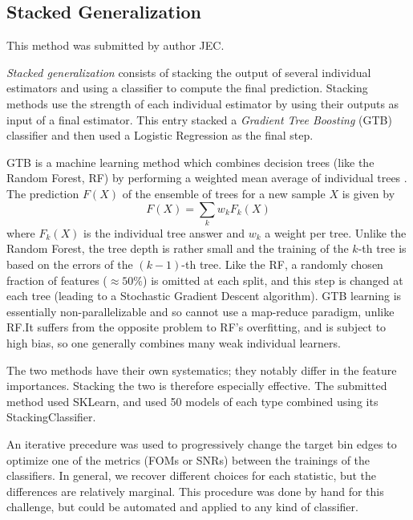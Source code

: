 \documentclass[twocolumn,twocolappendix]{aastex63}
\begin{document}
\subsection{ {\sc Stacked Generalization} }
This method was submitted by author JEC.

\emph{Stacked generalization} consists of stacking the output of several individual estimators and 
using a classifier to compute the final prediction. Stacking methods use the strength of each 
individual estimator by using their outputs as input of a final estimator.  This entry stacked
a \emph{Gradient Tree Boosting} (GTB) classifier and then used a Logistic Regression as the final step.

GTB is a machine learning method which combines decision trees (like the Random Forest, RF)
by performing a weighted mean average of individual trees \citep{Friedman:2002we,RefWorks:1634}. 
The prediction $F(X)$ of the ensemble of trees for a new sample $X$ is given by
\begin{equation}
F(X) = \sum_k w_k F_k(X)
\end{equation}
where $F_k(X)$ is the individual tree answer and $w_k$ a weight per tree. Unlike the Random Forest, the 
tree depth is rather small and the training  of the $k$-th tree is based on the errors of the
$(k-1)$-th tree.  Like the RF, a randomly chosen fraction of features ($\approx 50\%$) is 
omitted at each split, and this step is changed at each tree (leading to a Stochastic Gradient Descent 
algorithm).  GTB learning is essentially non-parallelizable and so cannot use a map-reduce paradigm, 
unlike RF.It suffers from the opposite problem to RF's overfitting, and is subject
to high bias, so one generally combines many weak individual learners.

The two methods have their own systematics; they notably differ in the feature importances. Stacking 
the two is therefore especially effective.  The submitted method used {\sc SKLearn}, and used 50 models 
of each type combined using its {\sc StackingClassifier}.

An iterative precedure was used to progressively change the target bin edges to optimize one of the metrics (FOMs or SNRs) between the trainings of the classifiers. In general, we recover different choices for each statistic, but the differences are relatively marginal. This procedure was done by hand for this challenge, but could be automated and applied to any kind of classifier.


 
\end{document}
